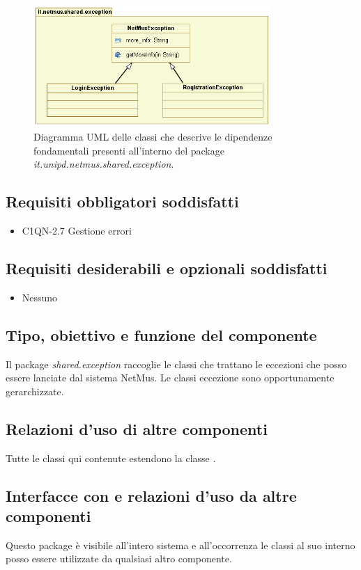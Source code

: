 \begin{figure}[!h]
  \centering
  \includegraphics[width=9cm]{img/DP/classes_shared_exception.png}
\caption{Diagramma UML delle classi che descrive le dipendenze
fondamentali presenti all'interno del package
\emph{it.unipd.netmus.shared.exception}.}
\end{figure}


\subsection*{Requisiti obbligatori soddisfatti}
\begin{itemize}
	\item C1QN-2.7 Gestione errori
\end{itemize}
\subsection*{Requisiti desiderabili e opzionali soddisfatti}
\begin{itemize}
    \item Nessuno
\end{itemize}
\subsection*{Tipo, obiettivo e funzione del componente}
Il package \emph{shared.exception} raccoglie le classi che trattano
le eccezioni che posso essere lanciate dal sistema NetMus. Le classi eccezione
sono opportunamente gerarchizzate. 
\subsection*{Relazioni d'uso di altre componenti}
Tutte le classi qui contenute estendono la classe .
\subsection*{Interfacce con e relazioni d'uso da altre componenti}
Questo package \`e visibile all'intero sistema e all'occorrenza le classi al suo
interno posso essere utilizzate da qualsiasi altro componente.
